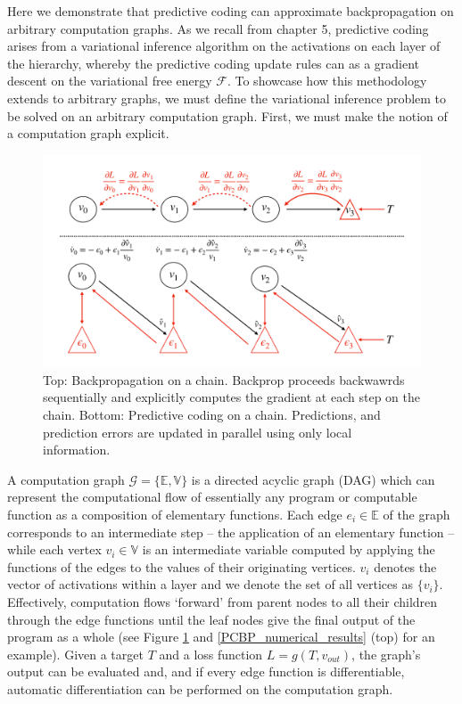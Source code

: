 Here we demonstrate that predictive coding can approximate backpropagation on arbitrary computation graphs. As we recall from chapter 5, predictive coding arises from a variational inference algorithm on the activations on each layer of the hierarchy, whereby the predictive coding update rules can as a gradient descent on the variational free energy $\mathcal{F}$. To showcase how this methodology extends to arbitrary graphs, we must define the variational inference problem to be solved on an arbitrary computation graph. First, we must make the notion of a computation graph explicit. 

\begin{figure}[ht]
    \centering
    \includegraphics[width=\textwidth]{chapter_6_figures/pc_chain_schematic_new.pdf}
    \caption{Top: Backpropagation on a chain. Backprop proceeds backwawrds sequentially and  explicitly computes the gradient at each step on the chain. Bottom: Predictive coding on a chain.  Predictions, and prediction errors are updated in parallel using only local information.}
\label{main_PCBP_schematic}
\end{figure}

A computation graph $\mathcal{G} = \{\mathbb{E},\mathbb{V}\}$ is a directed acyclic graph (DAG) which can represent the computational flow of essentially any program or computable function as a composition of elementary functions. Each edge $e_i \in \mathbb{E}$ of the graph corresponds to an intermediate step -- the application of an elementary function -- while each vertex $v_i \in \mathbb{V}$ is an intermediate variable computed by applying the functions of the edges to the values of their originating vertices. $v_i$ denotes the vector of activations within a layer and we denote the set of all vertices as $\{v_i\}$. Effectively, computation flows `forward' from parent nodes to all their children through the edge functions until the leaf nodes give the final output of the program as a whole (see Figure \ref{main_PCBP_schematic} and \ref{PCBP_numerical_results} (top) for an example). Given a target $T$ and a loss function $L = g(T, v_{out})$, the graph's output can be evaluated and, and if every edge function is differentiable, automatic differentiation can be performed on the computation graph.


